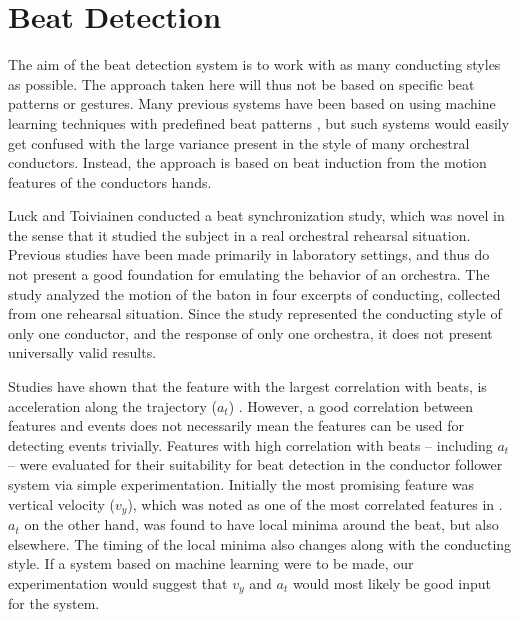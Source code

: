\section{Beat Detection}
\label{sec:beat_detection}

The aim of the beat detection system is
to work with as many conducting styles as possible.
The approach taken here will thus not be
based on specific beat patterns or gestures.
Many previous systems have been based on
using machine learning techniques with
predefined beat patterns \cite{getsomecites},
but such systems would easily get confused with
the large variance present in the style of
many orchestral conductors.
Instead, the approach is based on beat induction
from the motion features of the conductors hands.

Luck and Toiviainen \cite{luck2006}
conducted a beat synchronization study,
which was novel in the sense that it studied
the subject in a real orchestral rehearsal situation.
Previous studies have been made primarily in laboratory settings,
and thus do not present a good foundation
for emulating the behavior of an orchestra.
The study analyzed the motion of the baton
in four excerpts of conducting,
collected from one rehearsal situation.
Since the study represented the conducting style of only one conductor,
and the response of only one orchestra,
it does not present universally valid results.

Studies have shown
that the feature with the largest correlation with beats,
is acceleration along the trajectory ($a_t$)
\cite{LuckSloboda2008, LuckSloboda2009}.
However, a good correlation between features and events
does not necessarily mean the features can be used
for detecting events trivially.
Features with high correlation with beats --
including $a_t$ --
were evaluated for their suitability for beat detection
in the conductor follower system
via simple experimentation.
Initially the most promising feature was
vertical velocity ($v_y$),
which was noted as one of the most correlated features in \cite{luck2006}.
$a_t$ on the other hand, was found to have local minima
around the beat, but also elsewhere.
The timing of the local minima also changes along with the conducting style.
If a system based on machine learning were to be made,
our experimentation would suggest that $v_y$ and $a_t$
would most likely be good input for the system.

